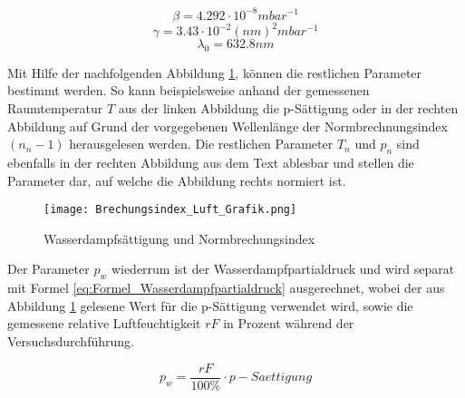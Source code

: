 \begin{equation*}
\beta = 4.292 \cdot 10^{-8} mbar^{-1}
\label{eq:Faktor_Beta}
\end{equation*}
\begin{equation*}
\gamma = 3.43 \cdot 10^{-2} (nm)^{2}mbar^{-1}
\label{eq:Faktor_Gamma}
\end{equation*}
\begin{equation*}
\lambda_{0} = 632.8 nm
\label{eq:Faktor_Lambda}
\end{equation*}

Mit Hilfe der nachfolgenden Abbildung \ref{fig:Wasserdampfsättigung und Normbrechungsindex}, können die restlichen Parameter bestimmt werden. So kann beispielsweise anhand der gemessenen Raumtemperatur $T$ aus der linken Abbildung die p-Sättigung oder in der rechten Abbildung auf Grund der vorgegebenen Wellenlänge der Normbrechnungsindex $(n_{n} - 1)$ herausgelesen werden. Die restlichen Parameter $T_{n}$ und $p_{n}$ sind ebenfalls in der rechten Abbildung aus dem Text ablesbar und stellen die Parameter dar, auf welche die Abbildung rechts normiert ist.

\begin{figure}[b]
\texttt{[image: Brechungsindex\_Luft\_Grafik.png]}
\caption{Wasserdampfsättigung und Normbrechungsindex}
\label{fig:Wasserdampfsättigung und Normbrechungsindex}
\end{figure}

Der Parameter $p_{w}$ wiederrum ist der Wasserdampfpartialdruck und wird separat mit Formel \ref{eq:Formel_Wasserdampfpartialdruck} ausgerechnet, wobei der aus Abbildung \ref{fig:Wasserdampfsättigung und Normbrechungsindex} gelesene Wert für die p-Sättigung verwendet wird, sowie die gemessene relative Luftfeuchtigkeit $rF$ in Prozent während der Versuchsdurchführung.

\begin{equation}
p_{w} = \dfrac{rF}{100\%} \cdot p-Saettigung
\label{eq:Formel_Wasserdampfpartialdruck}
\end{equation}

